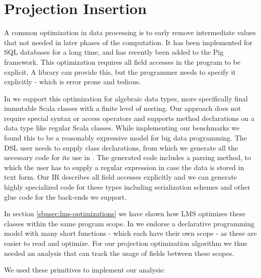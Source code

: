 \section{Projection Insertion}

A common optimization in data processing is to early remove intermediate values that not needed in later phases of the computation. It has been implemented for SQL databases for a long time, and has recently been added to the Pig framework. This optimization requires all field accesses in the program to be explicit. A library can provide this, but the programmer needs to specify it explicitly - which is error prone and tedious. 


In \tool we support this optimization for algebraic data types, more specifically final immutable Scala classes with a finite level of nesting. Our approach does not require special syntax or access operators and supports method declarations on a data type like  regular Scala classes. While implementing our benchmarks we found this to be a reasonably expressive model for big data programming. The DSL user needs to supply class declarations, from which we generate all the necessary code for its use in \tool. The generated code includes a parsing method, to which the user has to supply a regular expression in case the data is stored in text form. Our IR describes all field accesses explicitly and we can generate highly specialized code for these types including serialization schemes and other glue code for the back-ends we support.

% 
In section \ref{sbusec:lms-optimizations} we have shown how LMS optimizes these classes within the same program scope. In \tool we endorse a declarative programming model with many short functions - which each have their own scope - as these are easier to read and optimize. For our projection optimization algorithm we thus needed an analysis that can track the usage of fields between these scopes. 

 We used these primitives to implement our analysis: 


